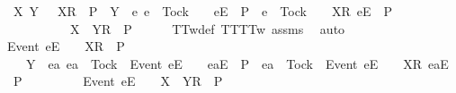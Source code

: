 \ {\isachardoublequoteopen}{\isasymforall}{\isasymrho}\ X\ Y{\isachardot}\ {\isasymrho}\ {\isacharat}\ {\isacharbrackleft}{\isacharbrackleft}X{\isacharbrackright}\isactrlsub R{\isacharbrackright}\ {\isasymin}\ P\ {\isasymand}\ Y\ {\isasyminter}\ {\isacharbraceleft}e{\isachardot}\ e\ {\isasymnoteq}\ Tock\ {\isasymand}\ {\isasymrho}\ {\isacharat}\ {\isacharbrackleft}{\isacharbrackleft}e{\isacharbrackright}\isactrlsub E{\isacharbrackright}\ {\isasymin}\ P\ {\isasymor}\ e\ {\isacharequal}\ Tock\ {\isasymand}\ {\isasymrho}\ {\isacharat}\ {\isacharbrackleft}{\isacharbrackleft}X{\isacharbrackright}\isactrlsub R{\isacharcomma}\ {\isacharbrackleft}e{\isacharbrackright}\isactrlsub E{\isacharbrackright}\ {\isasymin}\ P{\isacharbraceright}\ {\isacharequal}\ {\isacharbraceleft}{\isacharbraceright}\ {\isasymlongrightarrow}\isanewline
\ \ \ \ \ \ \ \ \ {\isasymrho}\ {\isacharat}\ {\isacharbrackleft}{\isacharbrackleft}X\ {\isasymunion}\ Y{\isacharbrackright}\isactrlsub R{\isacharbrackright}\ {\isasymin}\ P{\isachardoublequoteclose}\isanewline
\ \ \ \ \isamarkupfalse%
\ TT{}w{\isacharunderscore}def\ TT{\isacharunderscore}TT{}w\ assms{\isacharparenleft}{}{\isacharparenright}\ \isamarkupfalse%
\ auto\isanewline
\ \ \isamarkupfalse%
\ \isamarkupfalse%
\ {\isachardoublequoteopen}{\isacharbrackleft}Event\ e{\isacharbrackright}\isactrlsub E\ {\isacharhash}\ {\isasymrho}\ {\isacharat}\ {\isacharbrackleft}{\isacharbrackleft}X{\isacharbrackright}\isactrlsub R{\isacharbrackright}\ {\isasymin}\ P\ {\isasymLongrightarrow}\isanewline
\ \ \ \ Y\ {\isasyminter}\ {\isacharbraceleft}ea{\isachardot}\ ea\ {\isasymnoteq}\ Tock\ {\isasymand}\ {\isacharbrackleft}Event\ e{\isacharbrackright}\isactrlsub E\ {\isacharhash}\ {\isasymrho}\ {\isacharat}\ {\isacharbrackleft}{\isacharbrackleft}ea{\isacharbrackright}\isactrlsub E{\isacharbrackright}\ {\isasymin}\ P\ {\isasymor}\ ea\ {\isacharequal}\ Tock\ {\isasymand}\ {\isacharbrackleft}Event\ e{\isacharbrackright}\isactrlsub E\ {\isacharhash}\ {\isasymrho}\ {\isacharat}\ {\isacharbrackleft}{\isacharbrackleft}X{\isacharbrackright}\isactrlsub R{\isacharcomma}\ {\isacharbrackleft}ea{\isacharbrackright}\isactrlsub E{\isacharbrackright}\ {\isasymin}\ P{\isacharbraceright}\ {\isacharequal}\ {\isacharbraceleft}{\isacharbraceright}\ {\isasymLongrightarrow}\isanewline
\ \ \ \ \ \ {\isacharbrackleft}Event\ e{\isacharbrackright}\isactrlsub E\ {\isacharhash}\ {\isasymrho}\ {\isacharat}\ {\isacharbrackleft}{\isacharbrackleft}X\ {\isasymunion}\ Y{\isacharbrackright}\isactrlsub R{\isacharbrackright}\ {\isasymin}\ P{\isachardoublequoteclose}\isanewline
